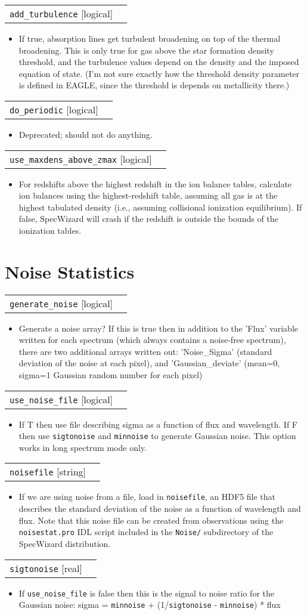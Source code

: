 \documentclass{report}
\makeatletter
\newcommand{\paramdefinition}[3]{
\begin{tabular*}{\textwidth}{l@{\extracolsep{\fill}}r}
		{\tt #1} [{\sc #2}]& #3 \\
\end{tabular*}}
\newcommand{\paramdescription}[1]{
\begin{itemize}
\item #1
\end{itemize}\vspace{0.2cm}}
\makeatother
\begin{document}
\paramdefinition{add\_turbulence}{logical}{}
\paramdescription{If true, absorption lines get turbulent broadening on top of the thermal broadening. This is only true for gas above the star formation density threshold, and the turbulence values depend on the density and the imposed equation of state. (I'm not sure exactly how the threshold density parameter is defined in EAGLE, since the threshold is depends on metallicity there.)}

\paramdefinition{do\_periodic}{logical}{}
\paramdescription{Deprecated; should not do anything.}

\paramdefinition{use\_maxdens\_above\_zmax}{logical}{}
\paramdescription{For redshifts above the highest redshift in the ion balance tables, calculate ion balances using the highest-redshift table, assuming all gas is at the highest tabulated density (i.e., assuming collisional ionization equilibrium). If false, SpecWizard will crash if the redshift is outside the bounds of the ionization tables.}


\section{Noise Statistics}

\paramdefinition{generate\_noise}{logical}{}
\paramdescription{Generate a noise array?  If this is true then in addition to the 'Flux' variable written for each spectrum (which always contains a noise-free spectrum), there are two additional arrays written out: 'Noise\_Sigma' (standard deviation of the noise at each pixel), and 'Gaussian\_deviate' (mean=0, sigma=1 Gaussian random number for each pixel)}

\paramdefinition{use\_noise\_file}{logical}{}
\paramdescription{If T then use file describing sigma as a function of flux and wavelength.  If F then use {\tt sigtonoise} and {\tt minnoise} to generate Gaussian noise.  This option works in long spectrum mode only.}

\paramdefinition{noisefile}{string}{}
\paramdescription{If we are using noise from a file, load in {\tt noisefile}, an HDF5 file that describes the standard deviation of the noise as a function of wavelength and flux.  Note that this noise file can be created from observations using the {\tt noisestat.pro} IDL script included in the {\tt Noise/} subdirectory of the SpecWizard distribution.}

\paramdefinition{sigtonoise}{real}{}
\paramdescription{If {\tt use\_noise\_file} is false then this is the signal to noise ratio for the Gaussian noise: sigma = {\tt minnoise} + (1/{\tt sigtonoise} - {\tt minnoise}) * flux}
\end{document}
